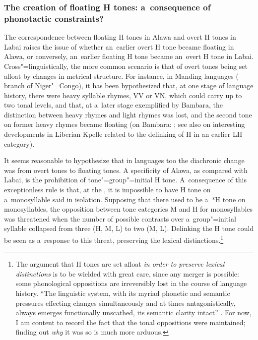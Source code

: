 \subsubsection{The creation of floating H tones: a~consequence of phonotactic constraints?}
\label{sec:thecreationoffloatinghtonesaconsequenceofphonotacticconstraints}

The correspondence between floating H tones in Alawa and overt H tones in Labai raises the issue of
whether an~earlier overt H tone became floating in Alawa, or conversely, an~earlier floating H
tone became an~overt H tone in Labai. Cross"=linguistically, the more common scenario is that of
overt tones being set afloat by changes in metrical structure. For instance, in {Manding} languages
( branch of Niger"=Congo), it has been hypothesized that, at one stage of language history,
there were heavy syllable rhymes, VV or VN, which could carry up to two tonal levels, and that, at
a~later stage exemplified by Bambara, the distinction between heavy rhymes and light rhymes was
lost, and the second tone on former heavy rhymes became floating (on Bambara: \citealt{creisselsetal1993}; see also \citealt{konoshenko2008} on interesting developments in Liberian Kpelle related to the delinking of H in an earlier LH category).

It seems reasonable to hypothesize that in  languages too the {diachronic} change was from overt tones to floating tones.
A specificity of Alawa, as compared with Labai, is the prohibition of tone"=group"=initial H
tone. A~consequence of this exceptionless rule is that, at the , it is
impossible to have H tone on a~{monosyllable} said in isolation. Supposing that there used to be a~*H tone on monosyllables, the opposition between tone categories M and H for monosyllables was threatened when the number of possible contrasts over a~group"=initial syllable
collapsed from three (H, M, L) to two (M, L). Delinking the H tone could be seen as a~response to this threat, preserving the lexical distinctions.\footnote{The argument that H tones are set afloat \textit{in order to preserve lexical distinctions} is to be wielded with great care, since any merger is possible: some phonological oppositions are irreversibly lost in the course of language history. “The linguistic system, with its
myriad phonetic and semantic pressures effecting changes simultaneously 
and at times antagonistically, always emerges functionally unscathed, its  
semantic clarity intact” \citep[697]{silverman2015}. For now, I am content to record the fact that the tonal oppositions were maintained; finding out \textit{why} it was so is much more arduous.}

